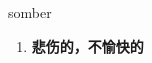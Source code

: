 
\begin{frame}
{\huge somber}
\begin{center}
\begin{enumerate}\Large
  \item \textbf{悲伤的，不愉快的}
\end{enumerate}
\end{center}
\end{frame}
